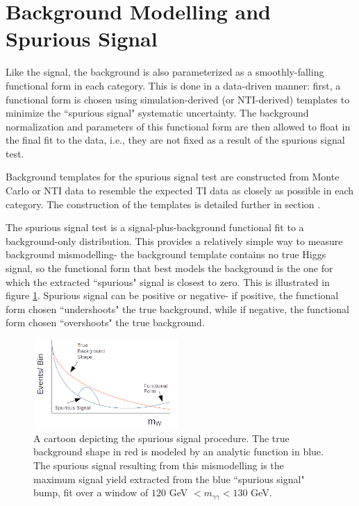 \section{Background Modelling and Spurious Signal} \label{sec:background_modelling} 

Like the signal, the background is also parameterized as a smoothly-falling functional form in each category. This is done in a data-driven manner: first, a functional form is chosen using simulation-derived (or NTI-derived) templates to minimize the ``spurious signal" systematic uncertainty. The background normalization and parameters of this functional form are then allowed to float in the final fit to the data, i.e., they are not fixed as a result of the spurious signal test. 

Background templates for the spurious signal test are constructed from Monte Carlo or NTI data to resemble the expected TI data as closely as possible in each category. The construction of the templates is detailed further in section \label{sec:bkgtemplates}.

The spurious signal test is a signal-plus-background functional fit to a background-only distribution. This provides a relatively simple way to measure background mismodelling- the background template contains no true Higgs signal, so the functional form that best models the background is the one for which the extracted ``spurious" signal is closest to zero. This is illustrated in figure \ref{fig:SScartoon}. Spurious signal can be positive or negative- if positive, the functional form chosen ``undershoots" the true background, while if negative, the functional form chosen ``overshoots" the true background.

\begin{figure}
\centering
\includegraphics[width=0.49\textwidth]{figures/sigbkgparam/SSCartoon.png}
\caption{A cartoon depicting the spurious signal procedure. The true background shape in red is modeled by an analytic function in blue. The spurious signal resulting from this mismodelling is the maximum signal yield extracted from the blue ``spurious signal" bump, fit over a window of $120$ GeV $< m_{\gamma \gamma}<130$ GeV.}
\label{fig:SScartoon}
\end{figure} 

